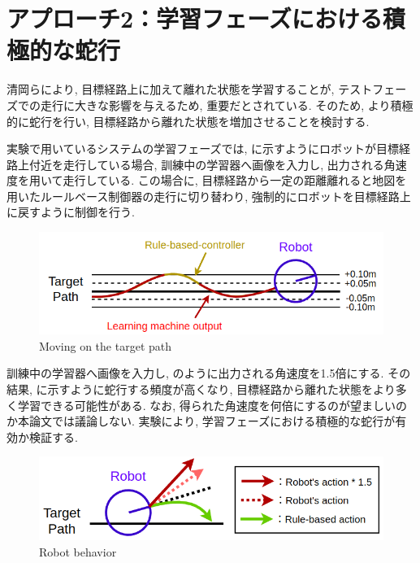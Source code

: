 
\newpage

\newpage

\section{アプローチ2：学習フェーズにおける積極的な蛇行}
清岡ら\cite{kiyooka}により, 目標経路上に加えて離れた状態を学習することが, テストフェーズでの走行に大きな影響を与えるため, 重要だとされている. そのため, より積極的に蛇行を行い, 目標経路から離れた状態を増加させることを検討する. \par
実験で用いているシステムの学習フェーズでは,  に示すようにロボットが目標経路上付近を走行している場合, 訓練中の学習器へ画像を入力し, 出力される角速度を用いて走行している. この場合に, 目標経路から一定の距離離れると地図を用いたルールベース制御器の走行に切り替わり, 強制的にロボットを目標経路上に戻すように制御を行う. 

\begin{figure}[hbtp]
  \centering
 \includegraphics[keepaspectratio, scale=0.58]
      {images/act1.0.png}
 \caption{Moving on the target path}
 \label{Fig:act1.0}
\end{figure}

訓練中の学習器へ画像を入力し, のように出力される角速度を1.5倍にする. その結果, に示すように蛇行する頻度が高くなり, 目標経路から離れた状態をより多く学習できる可能性がある. なお, 得られた角速度を何倍にするのが望ましいのか本論文では議論しない. 実験により, 学習フェーズにおける積極的な蛇行が有効か検証する.

\begin{figure}[hbtp]
  \centering
 \includegraphics[keepaspectratio, scale=0.5]
      {images/3action2.png}
 \caption{Robot behavior}
 \label{Fig:3action}
\end{figure}

